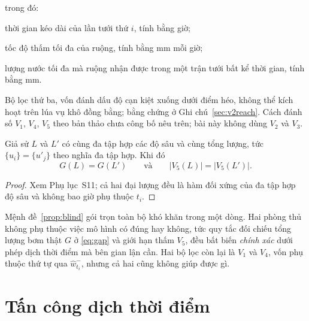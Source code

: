 trong đó:
\begin{symbolist}
\item[$\tau_i$] thời gian kéo dài của lần tưới thứ $i$, tính bằng giờ;
\item[$k_{\mathrm{inf}}$] tốc độ thấm tối đa của ruộng, tính bằng mm mỗi giờ;
\item[$p_{\max}$] lượng nước tối đa mà ruộng nhận được trong một trận tưới bất
    kể thời gian, tính bằng mm.
\end{symbolist}

Bộ lọc thứ ba, vốn đánh dấu độ cạn kiệt xuống dưới điểm héo, không thể kích hoạt
trên lúa vụ khô đồng bằng; bằng chứng ở Ghi chú~\ref{sec:v2reach}. Cách đánh số $V_1$, $V_4$, $V_5$ theo bản thảo chưa công bố nêu trên; bài này không dùng $V_2$ và $V_3$.

\begin{proposition}
\label{prop:blind}
Giả sử $L$ và $L'$ có cùng đa tập hợp các độ sâu và cùng tổng lượng, tức
$\{u_i\}=\{u'_j\}$ theo nghĩa đa tập hợp. Khi đó
\begin{equation}
G(L)=G(L')\qquad\text{và}\qquad |V_5(L)|=|V_5(L')|.
\end{equation}
\end{proposition}

\begin{proof}
Xem Phụ lục~S11; cả hai đại lượng đều là hàm đối xứng của đa tập hợp độ sâu và
không bao giờ phụ thuộc $t_i$.
\end{proof}

Mệnh đề~\ref{prop:blind} gói trọn toàn bộ khó khăn trong một dòng. Hai phòng thủ không phụ thuộc việc mô hình có đúng hay không, tức quy tắc đối
chiếu tổng lượng bơm thật $G$ ở \eqref{eq:gap} và giới hạn thấm $V_5$, đều bất
biến \emph{chính xác} dưới phép dịch thời điểm mà bên gian lận cần. Hai
bộ lọc còn lại là $V_1$ và $V_4$, vốn phụ thuộc thứ tự qua $\hat w_{t_i}^{-}$,
nhưng cả hai cũng không giúp được gì.

\section{Tấn công dịch thời điểm}
\label{sec:timeshift}

